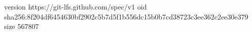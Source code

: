 version https://git-lfs.github.com/spec/v1
oid sha256:8f204df6454630bf2902c5b7d5f1b556dc15b0b7cd38723c3ee362c2ee30e379
size 567807
